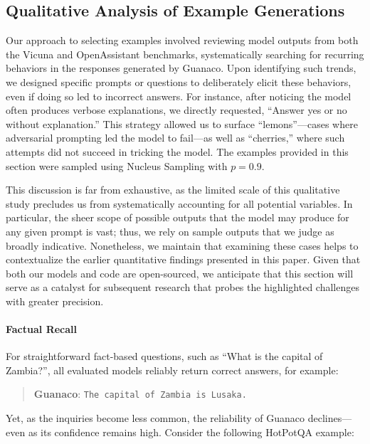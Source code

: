 \subsection{Qualitative Analysis of Example Generations}
\label{ssec:examples}

Our approach to selecting examples involved reviewing model outputs from both the Vicuna and OpenAssistant benchmarks, systematically searching for recurring behaviors in the responses generated by {Guanaco}. Upon identifying such trends, we designed specific prompts or questions to deliberately elicit these behaviors, even if doing so led to incorrect answers. For instance, after noticing the model often produces verbose explanations, we directly requested, ``Answer yes or no without explanation.'' This strategy allowed us to surface ``lemons''—cases where adversarial prompting led the model to fail—as well as ``cherries,'' where such attempts did not succeed in tricking the model. The examples provided in this section were sampled using Nucleus Sampling \cite{holtzmancurious} with $p=0.9$.

This discussion is far from exhaustive, as the limited scale of this qualitative study precludes us from systematically accounting for all potential variables. In particular, the sheer scope of possible outputs that the model may produce for any given prompt is vast; thus, we rely on sample outputs that we judge as broadly indicative. Nonetheless, we maintain that examining these cases helps to contextualize the earlier quantitative findings presented in this paper. Given that both our models and code are open-sourced, we anticipate that this section will serve as a catalyst for subsequent research that probes the highlighted challenges with greater precision.

\paragraph{Factual Recall} For straightforward fact-based questions, such as ``What is the capital of Zambia?'', all evaluated models reliably return correct answers, for example:

\begin{quote} 
    \textbf{Guanaco}:
    \texttt{The capital of Zambia is Lusaka.}
\end{quote}

Yet, as the inquiries become less common, the reliability of {Guanaco} declines—even as its confidence remains high. Consider the following HotPotQA \citep{yang2018hotpotqa} example:


